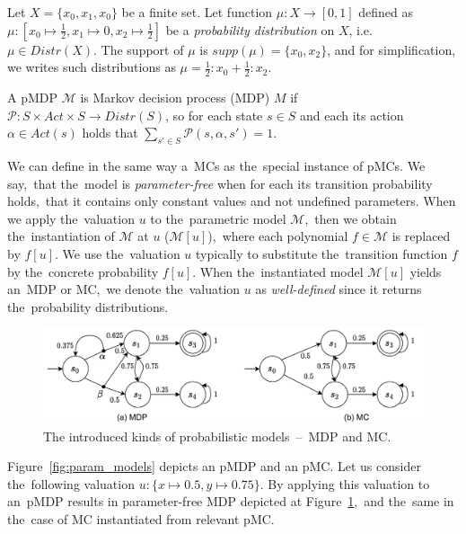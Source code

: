 \begin{example}
    Let $X = \{x_0, x_1, x_0\}$ be a finite set.
    Let function $\mu: X \rightarrow [0,1]$ defined as $\mu: [x_0 \mapsto \frac{1}{2}, x_1 \mapsto 0, x_2 \mapsto \frac{1}{2}]$ be a \textit{probability distribution} on $X$, i.e. $\mu \in Distr(X)$.
    The support of $\mu$ is $supp(\mu) = \{x_0, x_2 \}$, and for simplification, we writes such distributions as $\mu = \frac{1}{2} : x_0 + \frac{1}{2} : x_2$.
\end{example}


\begin{definition}[MDP]
    A pMDP $\mathcal{M}$ is Markov decision process (MDP) $M$ if $\mathcal{P}: S \times Act \times S \rightarrow Distr(S)$, so for each state $s \in S$ and each its action $\alpha \in Act(s)$ holds that $\sum_{s' \in S}{\mathcal{P}(s, \alpha, s')} = 1$.
\end{definition}
\noindent 
We can define in the same way a~MCs as the~special instance of pMCs.
We say,~that the~model is \textit{parameter-free} when for each its transition probability holds,~that it contains only constant values and not undefined parameters.
When we apply the~valuation $u$ to the~parametric model $\mathcal{M}$,~then we obtain the~instantiation of $\mathcal{M}$ at $u$ ($\mathcal{M}[u]$),~where each polynomial $f \in \mathcal{M}$ is replaced by $f[u]$.
We use the~valuation $u$ typically to substitute the~transition function $f$ by the~concrete probability $f[u]$.
When the~instantiated model $\mathcal{M}[u]$ yields an~MDP or MC,~we denote the~valuation $u$ as \textit{well-defined} since it returns the~probability distributions.

\begin{figure}[h!]
\centering
\includegraphics[width=1.0\textwidth]{figures/models.pdf}
\caption{The introduced kinds of probabilistic models \,--\, MDP and MC.}%
\label{fig:models}%
\end{figure}

\begin{example}
Figure~\ref{fig:param_models} depicts an pMDP and an pMC.
Let us consider the~following valuation $u: \{ x \mapsto 0.5, y \mapsto 0.75 \}$.
By applying this valuation to an~pMDP results in parameter-free MDP depicted at Figure~\ref{fig:models},~and the~same in the~case of MC instantiated from relevant pMC.
\end{example}

